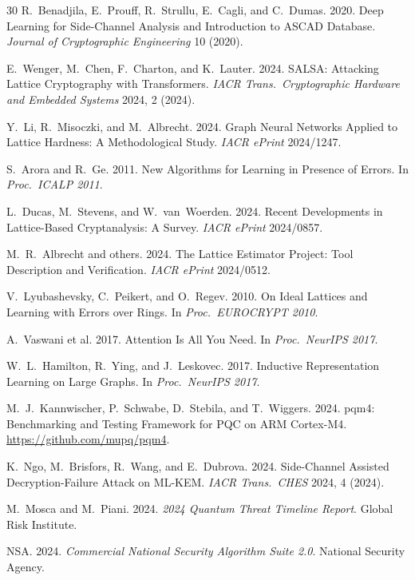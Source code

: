 \documentclass[sigconf,nonacm]{acmart}
\begin{document}
\begin{thebibliography}{30}
R.~Benadjila, E.~Prouff, R.~Strullu, E.~Cagli, and C.~Dumas. 2020.
Deep Learning for Side-Channel Analysis and Introduction to ASCAD
Database. \textit{Journal of Cryptographic Engineering} 10 (2020).

E.~Wenger, M.~Chen, F.~Charton, and K.~Lauter. 2024. SALSA: Attacking
Lattice Cryptography with Transformers.
\textit{IACR Trans.\ Cryptographic Hardware and Embedded Systems}
2024, 2 (2024).

Y.~Li, R.~Misoczki, and M.~Albrecht. 2024. Graph Neural Networks
Applied to Lattice Hardness: A Methodological Study.
\textit{IACR ePrint} 2024/1247.

S.~Arora and R.~Ge. 2011. New Algorithms for Learning in Presence
of Errors. In \textit{Proc.\ ICALP 2011}.

L.~Ducas, M.~Stevens, and W.~van~Woerden. 2024. Recent Developments in
Lattice-Based Cryptanalysis: A Survey. \textit{IACR ePrint} 2024/0857.

M.~R.~Albrecht and others. 2024. The Lattice Estimator Project: Tool
Description and Verification. \textit{IACR ePrint} 2024/0512.

V.~Lyubashevsky, C.~Peikert, and O.~Regev. 2010. On Ideal Lattices
and Learning with Errors over Rings. In \textit{Proc.\ EUROCRYPT 2010}.

A.~Vaswani et al. 2017. Attention Is All You Need.
In \textit{Proc.\ NeurIPS 2017}.

W.~L.~Hamilton, R.~Ying, and J.~Leskovec. 2017. Inductive Representation
Learning on Large Graphs. In \textit{Proc.\ NeurIPS 2017}.

M.~J.~Kannwischer, P.~Schwabe, D.~Stebila, and T.~Wiggers. 2024.
pqm4: Benchmarking and Testing Framework for PQC on ARM Cortex-M4.
\url{https://github.com/mupq/pqm4}.

K.~Ngo, M.~Brisfors, R.~Wang, and E.~Dubrova. 2024. Side-Channel
Assisted Decryption-Failure Attack on ML-KEM.
\textit{IACR Trans.\ CHES} 2024, 4 (2024).

M.~Mosca and M.~Piani. 2024. \textit{2024 Quantum Threat Timeline
Report}. Global Risk Institute.

NSA. 2024. \textit{Commercial National Security Algorithm Suite 2.0}.
National Security Agency.


\end{thebibliography}
\end{document}
